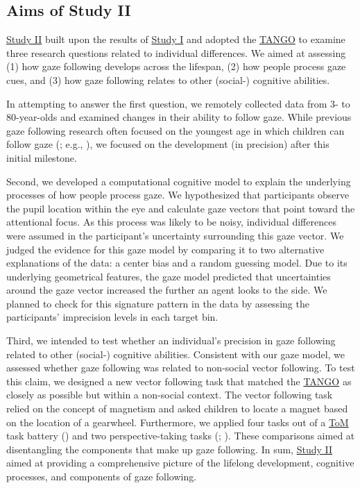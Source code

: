 \documentclass[
]{scrbook}
\begin{document}
\subsection{Aims of Study II}\label{aimsII}

\hyperref[studyII]{Study II} built upon the results of \hyperref[studyI]{Study I} and adopted the \hyperref[acronyms_TANGO]{TANGO} to examine three research questions related to individual differences. We aimed at assessing (1) how gaze following develops across the lifespan, (2) how people process gaze cues, and (3) how gaze following relates to other (social-) cognitive abilities.

In attempting to answer the first question, we remotely collected data from 3- to 80-year-olds and examined changes in their ability to follow gaze. While previous gaze following research often focused on the youngest age in which children can follow gaze (; e.g., ), we focused on the development (in precision) after this initial milestone.

Second, we developed a computational cognitive model to explain the underlying processes of how people process gaze. We hypothesized that participants observe the pupil location within the eye and calculate gaze vectors that point toward the attentional focus. As this process was likely to be noisy, individual differences were assumed in the participant's uncertainty surrounding this gaze vector. We judged the evidence for this gaze model by comparing it to two alternative explanations of the data: a center bias and a random guessing model. Due to its underlying geometrical features, the gaze model predicted that uncertainties around the gaze vector increased the further an agent looks to the side. We planned to check for this signature pattern in the data by assessing the participants' imprecision levels in each target bin.

Third, we intended to test whether an individual's precision in gaze following related to other (social-) cognitive abilities. Consistent with our gaze model, we assessed whether gaze following was related to non-social vector following. To test this claim, we designed a new vector following task that matched the \hyperref[acronyms_TANGO]{TANGO} as closely as possible but within a non-social context. The vector following task relied on the concept of magnetism and asked children to locate a magnet based on the location of a gearwheel. Furthermore, we applied four tasks out of a \hyperref[acronyms_ToM]{ToM} task battery () and two perspective-taking tasks (; ). These comparisons aimed at disentangling the components that make up gaze following. In sum, \hyperref[studyII]{Study II} aimed at providing a comprehensive picture of the lifelong development, cognitive processes, and components of gaze following.
\end{document}
